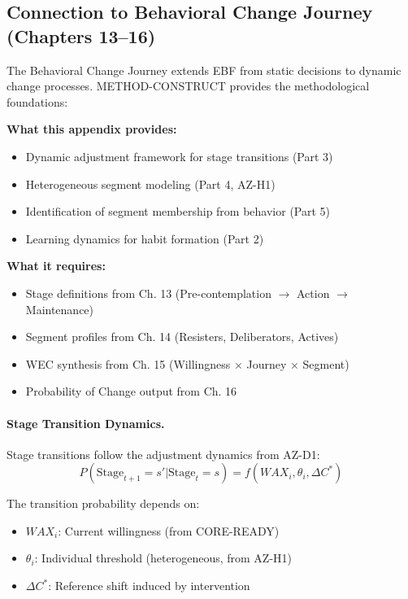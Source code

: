 \subsection{Connection to Behavioral Change Journey (Chapters 13--16)}

The Behavioral Change Journey extends EBF from static decisions to dynamic
change processes. METHOD-CONSTRUCT provides the methodological foundations:

\begin{tcolorbox}[colback=yellow!5!white, colframe=yellow!75!black,
    title=Integration: METHOD-CONSTRUCT $\leftrightarrow$ Behavioral Change]
\textbf{What this appendix provides:}
\begin{itemize}[nosep]
\item Dynamic adjustment framework for stage transitions (Part 3)
\item Heterogeneous segment modeling (Part 4, AZ-H1)
\item Identification of segment membership from behavior (Part 5)
\item Learning dynamics for habit formation (Part 2)
\end{itemize}

\textbf{What it requires:}
\begin{itemize}[nosep]
\item Stage definitions from Ch. 13 (Pre-contemplation $\to$ Action $\to$ Maintenance)
\item Segment profiles from Ch. 14 (Resisters, Deliberators, Actives)
\item WEC synthesis from Ch. 15 (Willingness $\times$ Journey $\times$ Segment)
\item Probability of Change output from Ch. 16
\end{itemize}
\end{tcolorbox}

\paragraph{Stage Transition Dynamics.}
Stage transitions follow the adjustment dynamics from AZ-D1:
\begin{equation}
P(\text{Stage}_{t+1} = s' | \text{Stage}_t = s) = f(WAX_i, \theta_i, \Delta C^*)
\end{equation}

The transition probability depends on:
\begin{itemize}[nosep]
\item $WAX_i$: Current willingness (from CORE-READY)
\item $\theta_i$: Individual threshold (heterogeneous, from AZ-H1)
\item $\Delta C^*$: Reference shift induced by intervention
\end{itemize}


